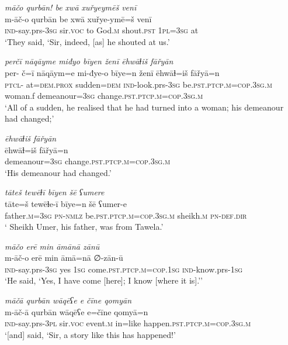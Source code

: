 \ea \label{ŠJ.44}
\textit{māčo qurbān! be xwā xuřyeymēš venī} \\ 
\gll m-āč-o qurbān be xwā xuřye-ymē=š venī \\ 
 \textsc{ind-}say.prs\textsc{-3sg} sir.\textsc{voc} to God\textsc{.m} shout\textsc{.pst} \textsc{1pl}\textsc{=3sg} at \\ 
\glt `They said, ‘Sir, indeed, [as] he shouted at us.'
\z 
 
\ea \label{ŠJ.48}
\textit{perčī nāqāyme miđyo bīyen ženī ēhwāɫiš fāřyān} \\ 
\gll per- č=ī nāqāym=e mi-đye-o bīye=n ženī ēhwāɫ=iš fāřyā=n \\ 
 \textsc{ptcl}- at=\textsc{dem.prox} sudden\textsc{=dem} \textsc{ind-}look.prs\textsc{-3sg} be\textsc{.pst}\textsc{.ptcp}\textsc{.m}\textsc{=cop}\textsc{.3sg}\textsc{.m} woman.f demeanour\textsc{=3sg} change\textsc{.pst}\textsc{.ptcp}\textsc{.m}\textsc{=cop}\textsc{.3sg}\textsc{.m} \\ 
\glt `All of a sudden, he realised that he had turned into a woman; his demeanour had changed;'
\z 
 
\ea \label{ŠJ.49}
\textit{ēhwāɫiš fāřyān} \\ 
\gll ēhwāɫ=iš fāřyā=n \\ 
 demeanour\textsc{=3sg} change\textsc{.pst}\textsc{.ptcp}\textsc{.m}\textsc{=cop}\textsc{.3sg}\textsc{.m} \\ 
\glt `His demeanour had changed.'
\z 
 
\ea \label{ŠJ.57}
\textit{tāteš tewēɫī bīyen šē ʕumere} \\ 
\gll tāte=š tewēɫe-ī bīye=n šē ʕumer-e \\ 
 father\textsc{.m}\textsc{=3sg} \textsc{pn}\textsc{-nmlz} be\textsc{.pst}\textsc{.ptcp}\textsc{.m}\textsc{=cop}\textsc{.3sg}\textsc{.m} sheikh\textsc{.m} \textsc{pn}\textsc{-def}\textsc{.dir} \\ 
\glt ` Sheikh Umer, his father, was from Tawela.'
\z 
 
\ea \label{ŠJ.61}
\textit{māčo erē min āmānā zānū} \\ 
\gll m-āč-o erē min āmā=nā ∅-zān-ū \\ 
 \textsc{ind-}say.prs\textsc{-3sg} yes \textsc{1sg} come\textsc{.pst}\textsc{.ptcp}\textsc{.m}\textsc{=cop}\textsc{.\textsc{1sg}} \textsc{ind-}know.prs\textsc{-\textsc{1sg}} \\ 
\glt `He said, ‘Yes, I have come [here]; I know [where it is].’'
\z 
 
\ea \label{ŠJ.69}
\textit{māčā qurbān wāqēʕe e čīne qomyān} \\ 
\gll m-āč-ā qurbān wāqēʕe e=čīne qomyā=n \\ 
 \textsc{ind-}say.prs\textsc{-3pl} sir.\textsc{voc} event\textsc{.m} in=like happen\textsc{.pst}\textsc{.ptcp}\textsc{.m}\textsc{=cop}\textsc{.3sg}\textsc{.m} \\ 
\glt `[and] said, ‘Sir, a story like this has happened!'
\z 
 
